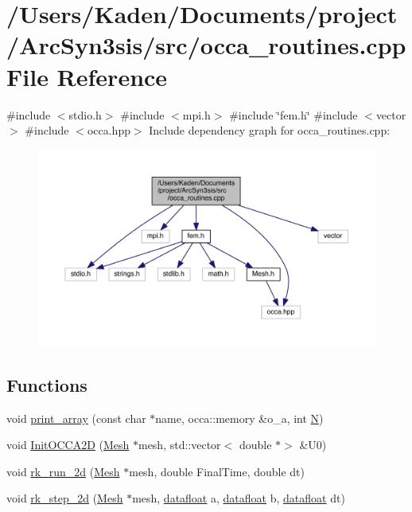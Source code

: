 \hypertarget{a00584}{}\section{/\+Users/\+Kaden/\+Documents/project/\+Arc\+Syn3sis/src/occa\+\_\+routines.cpp File Reference}
\label{a00584}
{\ttfamily \#include $<$stdio.\+h$>$}\newline
{\ttfamily \#include $<$mpi.\+h$>$}\newline
{\ttfamily \#include \char`\"{}fem.\+h\char`\"{}}\newline
{\ttfamily \#include $<$vector$>$}\newline
{\ttfamily \#include $<$occa.\+hpp$>$}\newline
Include dependency graph for occa\+\_\+routines.\+cpp\+:\nopagebreak
\begin{figure}[H]
\begin{center}
\leavevmode
\includegraphics[width=350pt]{a00585}
\end{center}
\end{figure}
\subsection*{Functions}
\begin{DoxyCompactItemize}
\item 
void \hyperlink{a00584_a799a7d00720c00822259c59c686fc672}{print\+\_\+array} (const char $\ast$name, occa\+::memory \&o\+\_\+a, int \hyperlink{a00473_a5b9c4563028063ee53b517cce9aa701b}{N})
\item 
void \hyperlink{a00584_a0dee5ebc8cec6627fc23083e47b4ca11}{Init\+O\+C\+C\+A2D} (\hyperlink{a00557_aeffbe0891ab73a4d8964c9cb7978426e}{Mesh} $\ast$mesh, std\+::vector$<$ double $\ast$$>$ \&U0)
\item 
void \hyperlink{a00584_a21a02761bc746f8e6205d02f662aee16}{rk\+\_\+run\+\_\+2d} (\hyperlink{a00557_aeffbe0891ab73a4d8964c9cb7978426e}{Mesh} $\ast$mesh, double Final\+Time, double dt)
\item 
void \hyperlink{a00584_a9b253cfe04029e084b403542b0d7a64b}{rk\+\_\+step\+\_\+2d} (\hyperlink{a00557_aeffbe0891ab73a4d8964c9cb7978426e}{Mesh} $\ast$mesh, \hyperlink{a00557_aa484d27c864c1a224505d8a302c0a4a4}{datafloat} a, \hyperlink{a00557_aa484d27c864c1a224505d8a302c0a4a4}{datafloat} b, \hyperlink{a00557_aa484d27c864c1a224505d8a302c0a4a4}{datafloat} dt)
\end{DoxyCompactItemize}

